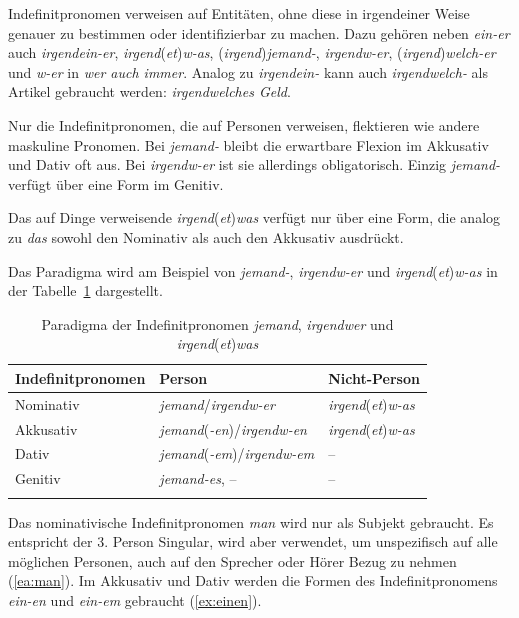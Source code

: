 Indefinitpronomen verweisen auf Entitäten, ohne diese in irgendeiner Weise genauer zu bestimmen oder identifizierbar zu machen. Dazu gehören neben \textit{ein-er} auch \textit{irgendein-er}, \textit{irgend}(\textit{et})\textit{w-as}, (\textit{irgend})\textit{jemand-}, \textit{irgendw-er}, (\textit{irgend})\textit{welch-er} und \textit{w-er} in \textit{wer auch immer}. Analog zu \textit{irgendein-} kann auch \textit{irgendwelch-} als Artikel gebraucht werden: \textit{irgendwelches Geld}.

Nur die Indefinitpronomen, die auf Personen verweisen, flektieren wie andere maskuline Pronomen. Bei \textit{jemand-} bleibt die erwartbare Flexion im Akkusativ und Dativ oft aus. Bei \textit{irgendw-er} ist sie allerdings obligatorisch. Einzig \textit{jemand-} verfügt über eine Form im Genitiv. 

Das auf Dinge verweisende \textit{irgend}(\textit{et})\textit{was} verfügt nur über eine Form, die analog zu \textit{das} sowohl den Nominativ als auch den Akkusativ ausdrückt. 

Das Paradigma wird am Beispiel von \textit{jemand-}, \textit{irgendw-er} und \textit{irgend}(\textit{et})\textit{w-as} in der Tabelle~\ref{tab:Indef_Prn} dargestellt.


\begin{table}
  \centering
  \begin{tabular}{l l l}
    \lsptoprule
    Indefinitpronomen & Person & Nicht-Person \\
    \hline
    Nominativ & \textit{jemand}/\textit{irgendw-er} & \textit{irgend}(\textit{et})\textit{w-as} \\
    
    Akkusativ & \textit{jemand}(\textit{-en})/\textit{irgendw-en}
    & \textit{irgend}(\textit{et})\textit{w-as}  \\
    
    Dativ & \textit{jemand}(\textit{-em})/\textit{irgendw-em} & -- \\
    
    Genitiv & \textit{jemand-es}, -- & -- \\
    \lspbottomrule 
  \end{tabular}
  \caption{Paradigma der Indefinitpronomen \textit{jemand}, \textit{irgendwer} und \textit{irgend}(\textit{et})\textit{was}}
  \label{tab:Indef_Prn}
\end{table}

Das nominativische Indefinitpronomen \textit{man} wird nur als Subjekt gebraucht. Es entspricht der 3. Person Singular, wird aber verwendet, um unspezifisch auf alle möglichen Personen, auch auf den Sprecher oder Hörer Bezug zu nehmen (\ref{ea:man}). Im Akkusativ und Dativ werden die Formen des Indefinitpronomens \textit{ein-en} und \textit{ein-em} gebraucht (\ref{ex:einen}). 

